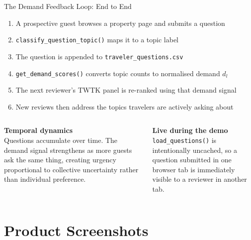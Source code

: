 \documentclass[aspectratio=169,10pt]{beamer}
\begin{document}
\begin{frame}{The Demand Feedback Loop: End to End}

\begin{enumerate}
  \item A prospective guest browses a property page and submits a question
  \item \texttt{classify\_question\_topic()} maps it to a topic label
  \item The question is appended to \texttt{traveler\_questions.csv}
  \item \texttt{get\_demand\_scores()} converts topic counts to
        normalised demand $d_l$
  \item The next reviewer's TWTK panel is re-ranked using that demand signal
  \item New reviews then address the topics travelers are actively asking about
\end{enumerate}

\bigskip
\begin{columns}[T]
\textbf{Temporal dynamics}\\[0.2em]
\small
Questions accumulate over time. The demand signal strengthens as more guests
ask the same thing, creating urgency proportional to collective uncertainty
rather than individual preference.

\textbf{Live during the demo}\\[0.2em]
\small
\texttt{load\_questions()} is intentionally uncached, so a question
submitted in one browser tab is immediately visible to a reviewer
in another tab.
\end{columns}
\end{frame}


\section{Product Screenshots}
\end{document}
